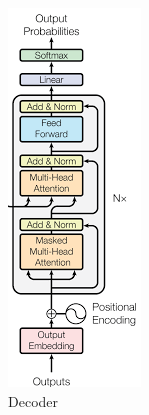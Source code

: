 \begin{figure}[h]
	\centering
	\begin{minipage}[b]{0.25\textwidth}
		\centering
		\includegraphics[width=\textwidth]{transformer_images/decoder.png}
		\caption{Decoder}
		\label{fig:Decoder}
	\end{minipage}
	\hfill
	
\end{figure}

